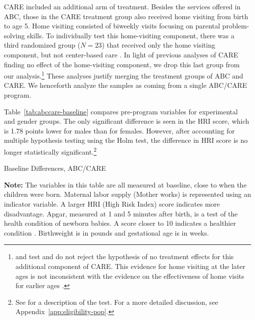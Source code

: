 CARE included an additional arm of treatment. Besides the services offered in ABC, those in the CARE treatment group also received home visiting from birth to age 5. Home visiting consisted of biweekly visits focusing on parental problem-solving skills. To individually test this home-visiting component, there was a third randomized group ($N=23$) that received only the home visiting component, but not center-based care \citep{Wasik_Ramey_etal_1990_CD}. In light of previous analyses of CARE finding no effect of the home-visiting component, we drop this last group from our analysis.\footnote{\citet{Campbell_Conti_etal_2014_EarlyChildhoodInvestments} and \citet{Burchinal_etal_2006_MSRCD_IV-Growth-Curve} test and do not reject the hypothesis of no treatment effects for this additional component of CARE. This evidence for home visiting at the later ages is not inconsistent with the evidence on the effectiveness of home visits for earlier ages \citet{Doyle_2017_School,Gertler_Heckman_etal_2014_Science}.} These analyses justify merging the treatment groups of ABC and CARE. We henceforth analyze the samples as coming from a single ABC/CARE program.

Table~\ref{tab:abccare-baseline} compares pre-program variables for experimental and gender groups. The only significant difference is seen in the HRI score, which is 1.78 points lower for males than for females. However, after accounting for multiple hypothesis testing using the Holm test, the difference in HRI score is no longer statistically significant.\footnote{See \citet{Holme_1979_Sequential_SJS} for a description of the test. For a more detailed discussion, see Appendix~\ref{app:eligibility-pop}.}

\begin{table}[!htbp]
\centering
\caption{Baseline Differences, ABC/CARE}
\label{tab:abccare-baseline}
\begin{threeparttable}
	
\begin{tablenotes}
\footnotesize
\item \textbf{Note:} The variables in this table are all measured at baseline, close to when the children were born. Maternal labor supply (Mother works) is represented using an indicator variable. A larger HRI (High Risk Index) score indicates more disadvantage. Apgar, measured at 1 and 5 minutes after birth, is a test of the health condition of newborn babies. A score closer to 10 indicates a healthier condition \citep{Apgar_1966_APGAR-Scoring_PCNA}. Birthweight is in pounds and gestational age is in weeks.
\end{tablenotes}
\end{threeparttable}
\end{table}

